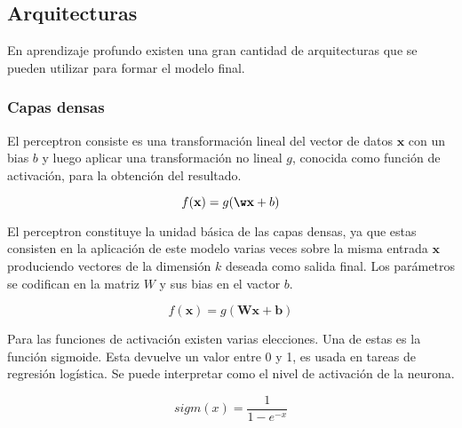 


\subsection{Arquitecturas}

En aprendizaje profundo existen una gran cantidad de arquitecturas que se pueden utilizar para formar el modelo 
final.

\subsubsection{Capas densas}

El perceptron consiste es una transformación lineal del vector de datos $\textbf{x}$ con un bias $b$ y 
luego aplicar una transformación no lineal $g$, conocida como función de activación, 
para la obtención del resultado.

\begin{equation}
	f(\textbf{x}) = g(\textbf{\w}\textbf{x} + b)
\end{equation}\label{eq:perceptron}

El perceptron constituye la unidad básica de las capas densas, ya que estas consisten en la aplicación
de este modelo varias veces sobre la misma entrada $\textbf{x}$ produciendo vectores de la dimensión $k$ 
deseada como salida final. Los parámetros se codifican en la matriz $W$ y sus bias en el vactor $b$.

\begin{equation}
	f(\textbf{x}) = g(\textbf{Wx} + \textbf{b})
\end{equation}\label{eq:dense}

Para las funciones de activación existen varias elecciones. Una de estas es la función sigmoide. 
Esta devuelve un valor entre 0 y 1, es usada en tareas de regresión logística. 
Se puede interpretar como el nivel de activación de la neurona.

\begin{equation}
	sigm(x) = \frac{1}{1-e^{-x}}
\end{equation}\label{eq:sigmoide}


